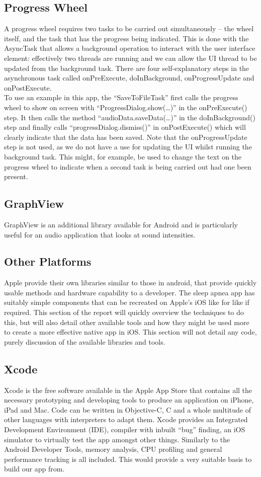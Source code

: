 \subsection{Progress Wheel}
A progress wheel requires two tasks to be carried out simultaneously – the wheel itself, and the task that has the progress being indicated. This is done with the AsyncTask that allows a background operation to interact with the user interface element: effectively two threads are running and we can allow the UI thread to be updated from the background task. There are four self-explanatory steps in the asynchronous task called onPreExecute, doInBackground, onProgressUpdate and onPostExecute.
\\ To use an example in this app, the “SaveToFileTask” first calls the progress wheel to show on screen with “ProgressDialog.show(…)” in the onPreExecute() step. It then calls the method “audioData.saveData(…)” in the doInBackground() step and finally calls “progressDialog.dismiss()” in onPostExecute() which will clearly indicate that the data has been saved. Note that the onProgressUpdate step is not used, as we do not have a use for updating the UI whilst running the background task. This might, for example, be used to change the text on the progress wheel to indicate when a second task is being carried out had one been present.
\subsection{GraphView}
GraphView is an additional library available for Android and is particularly useful for an audio application that looks at sound intensities. 
\subsection{Other Platforms}
Apple provide their own libraries similar to those in android, that provide quickly usable methods and hardware capability to a developer. The sleep apnea app has suitably simple components that can be recreated on Apple’s iOS like for like if required. This section of the report will quickly overview the techniques to do this, but will also detail other available tools and how they might be used more to create a more effective native app in iOS. This section will not detail any code, purely discussion of the available libraries and tools.
\subsection{Xcode}
Xcode is the free software available in the Apple App Store that contains all the necessary prototyping and developing tools to produce an application on iPhone, iPad and Mac. Code can be written in Objective-C, C and a whole multitude of other languages with interpreters to adapt them. Xcode provides an Integrated Development Environment (IDE), compiler with inbuilt “bug” finding, an iOS simulator to virtually test the app amongst other things. Similarly to the Android Developer Tools, memory analysis, CPU profiling and general performance tracking is all included. This would provide a very suitable basis to build our app from.
